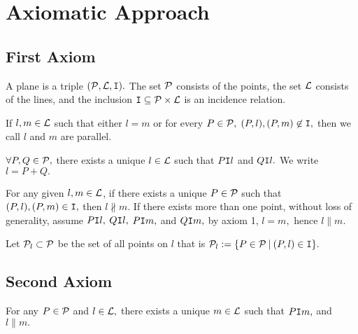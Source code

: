 


\maketitle

\chapter{Axiomatic Approach}

\section{First Axiom}

\begin{definition}
    A plane is a triple $(\mathcal{P},\mathcal{L},\texttt{I}).$ The set $\mathcal{P}$ consists of the points, the set $\mathcal{L}$ consists of the lines, and the inclusion $\texttt{I} \subseteq \mathcal{P} \times \mathcal{L}$ is an incidence relation. 
\end{definition}

\begin{definition}
    If $l,m \in \mathcal{L}$ such that either $l = m$ or for every $P \in \mathcal{P},$ $(P,l),(P,m) \not \in \texttt{I},$ then we call $l$ and $m$ are parallel.
\end{definition}

\begin{axiom}[1]
    $\forall P,Q \in \mathcal{P},$ there exists a unique $l \in \mathcal{L}$ such that $P \texttt{I} l$ and $Q \texttt{I} l.$ We write $l=P+Q.$
\end{axiom}

For any given $l,m \in \mathcal{L}$, if there exists a unique $P \in \mathcal{P}$ such that $(P,l),(P,m) \in \texttt{I},$ then $l \nparallel m$. If there exists more than one point, without loss of generality, assume $P \texttt{I} l,$ $Q \texttt{I} l,$ $P \texttt{I} m,$ and $Q \texttt{I} m,$ by axiom 1, $l=m,$ hence $l \parallel m.$

Let $\mathcal{P}_l \subset \mathcal{P}$ be the set of all points on $l$ that is $\mathcal{P}_l := \{ P \in \mathcal{P} \: | \: (P,l) \in \texttt{I}\}.$

\section{Second Axiom}

\begin{axiom}[2]
    For any $P \in \mathcal{P}$ and $l \in \mathcal{L},$ there exists a unique $m \in \mathcal{L}$ such that $P \texttt{I} m,$ and $l \parallel m.$
\end{axiom}

